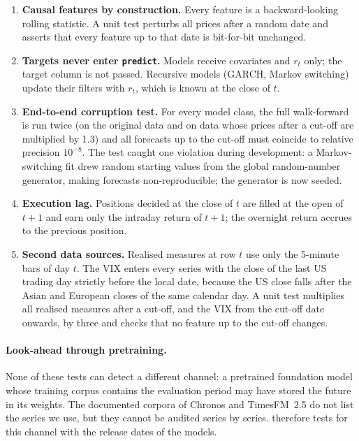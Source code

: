 \begin{enumerate}[leftmargin=1.5em]
\item \textbf{Causal features by construction.} Every feature is a backward-looking rolling statistic.
A unit test perturbs all prices after a random date and asserts that every feature up to that date is
bit-for-bit unchanged.
\item \textbf{Targets never enter \texttt{predict}.} Models receive covariates and $r_t$ only; the target
column is not passed. Recursive models (GARCH, Markov switching) update their filters with $r_t$, which
is known at the close of $t$.
\item \textbf{End-to-end corruption test.} For every model class, the full walk-forward is run twice
(on the original data and on data whose prices after a cut-off are multiplied by 1.3) and all
forecasts up to the cut-off must coincide to relative precision $10^{-8}$. The test caught one
violation during development: a Markov-switching fit drew random starting values from the global
random-number generator, making forecasts non-reproducible; the generator is now seeded.
\item \textbf{Execution lag.} Positions decided at the close of $t$ are filled at the open of $t+1$ and
earn only the intraday return of $t+1$; the overnight return accrues to the previous position.
\item \textbf{Second data sources.} Realised measures at row $t$ use only the 5-minute bars of day $t$.
The VIX enters every series with the close of the last US trading day strictly before the local date,
because the US close falls after the Asian and European closes of the same calendar day. A unit test
multiplies all realised measures after a cut-off, and the VIX from the cut-off date onwards, by three
and checks that no feature up to the cut-off changes.
\end{enumerate}

\paragraph{Look-ahead through pretraining.} None of these tests can detect a different channel: a
pretrained foundation model whose training corpus contains the evaluation period may have stored the
future in its weights. The documented corpora of Chronos and TimesFM~2.5 do not list the series we
use, but they cannot be audited series by series.  therefore tests for this channel
with the release dates of the models.

